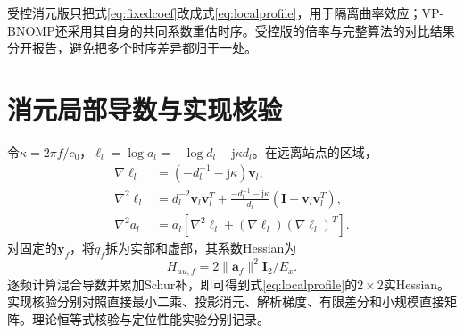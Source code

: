 受控消元版只把式\eqref{eq:fixedcoef}改成式\eqref{eq:localprofile}，用于隔离曲率效应；VP-BNOMP还采用其自身的共同系数重估时序。受控版的倍率与完整算法的对比结果分开报告，避免把多个时序差异都归于一处。

\section{消元局部导数与实现核验}\label{app:derivatives}
令$\kappa=2\pi f/c_0$，$\ell_l=\log a_l=-\log d_l-\mathrm j\kappa d_l$。在远离站点的区域，
\begin{align}
 \nabla\ell_l&=(-d_l^{-1}-\mathrm j\kappa)\bm v_l,\\
 \nabla^2\ell_l&=d_l^{-2}\bm v_l\bm v_l^T
 +\frac{-d_l^{-1}-\mathrm j\kappa}{d_l}
 (\bm I-\bm v_l\bm v_l^T),\\
 \nabla^2 a_l&=a_l[\nabla^2\ell_l+(\nabla\ell_l)(\nabla\ell_l)^T].\label{eq:responseHessian}
\end{align}
对固定的$\bm y_f$，将$q_f$拆为实部和虚部，其系数Hessian为
\begin{equation}
 H_{uu,f}=2\|\bm a_f\|^2\bm I_2/E_x .
\end{equation}
逐频计算混合导数并累加Schur补，即可得到式\eqref{eq:localprofile}的$2\times2$实Hessian。实现核验分别对照直接最小二乘、投影消元、解析梯度、有限差分和小规模直接矩阵。理论恒等式核验与定位性能实验分别记录。
